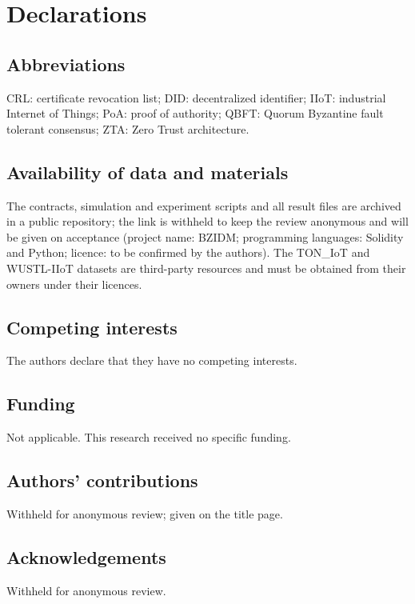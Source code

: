 \section*{Declarations}
\subsection*{Abbreviations}
CRL: certificate revocation list; DID: decentralized identifier; IIoT: industrial Internet of Things; PoA: proof of authority; QBFT: Quorum Byzantine fault tolerant consensus; ZTA: Zero Trust architecture.
\subsection*{Availability of data and materials}
The contracts, simulation and experiment scripts and all result files are archived in a public repository; the link is withheld to keep the review anonymous and will be given on acceptance (project name: BZIDM; programming languages: Solidity and Python; licence: to be confirmed by the authors). The TON\_IoT and WUSTL-IIoT datasets are third-party resources and must be obtained from their owners under their licences.
\subsection*{Competing interests}
The authors declare that they have no competing interests.
\subsection*{Funding}
Not applicable. This research received no specific funding.
\subsection*{Authors' contributions}
Withheld for anonymous review; given on the title page.
\subsection*{Acknowledgements}
Withheld for anonymous review.
